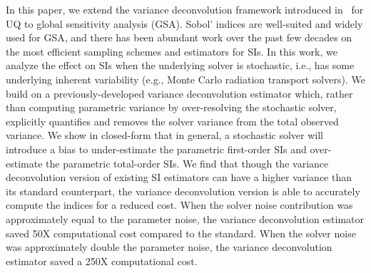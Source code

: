In this paper, we extend the variance deconvolution framework introduced in~\cite{clements-etal-2024} for UQ to global sensitivity analysis (GSA).
Sobol' indices are well-suited and widely used for GSA, and there has been abundant work over the past few decades on the most efficient sampling schemes and estimators for SIs. 
In this work, we analyze the effect on SIs when the underlying solver is stochastic, i.e., has some underlying inherent variability (e.g., Monte Carlo radiation transport solvers).
We build on a previously-developed variance deconvolution estimator which, rather than computing parametric variance by over-resolving the stochastic solver, explicitly quantifies and removes the solver variance from the total observed variance.
We show in closed-form that in general, a stochastic solver will introduce a bias to under-estimate the parametric first-order SIs and over-estimate the parametric total-order SIs. 
We find that though the variance deconvolution version of existing SI estimators can have a higher variance than its standard counterpart, the variance deconvolution version is able to accurately compute the indices for a reduced cost.
When the solver noise contribution was approximately equal to the parameter noise, the variance deconvolution estimator saved 50X computational cost compared to the standard.
When the solver noise was approximately double the parameter noise, the variance deconvolution estimator saved a 250X computational cost.


